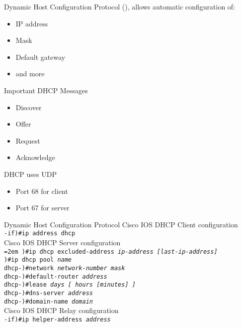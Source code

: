 \begin{frame}{Dynamic Host Configuration Protocol}
	 (), allows automatic configuration of:\pause
	\begin{itemize}[<+->]
		\item IP address
		\item Mask
		\item Default gateway
		\item and more
	\end{itemize}
	Important DHCP Messages\pause
	\begin{itemize}[<+->]
		\item Discover
		\item Offer
		\item Request
		\item Acknowledge
	\end{itemize}
	DHCP uses UDP\pause
	\begin{itemize}[<+->]
		\item Port 68 for client
		\item Port 67 for server
	\end{itemize}
\end{frame}

\begin{frame}{Dynamic Host Configuration Protocol}
	Cisco IOS DHCP Client configuration
	\\\pause\texttt{-if)\#ip address dhcp}
	\\\vspace{0.5cm}\pause Cisco IOS DHCP Server configuration
	\texttt{
		\\\pause \hangindent=2em )\#ip dhcp excluded-address \textit{ip-address [last-ip-address]}
		\\\pause )\#ip dhcp pool \textit{name}
		\\\pause dhcp-)\#network \textit{network-number mask}
		\\\pause dhcp-)\#default-router \textit{address}
		\\\pause dhcp-)\#lease \textit{days [ hours [minutes] ]}
		\\\pause dhcp-)\#dns-server \textit{address}
		\\\pause dhcp-)\#domain-name \textit{domain}
	}\\\vspace{0.5cm}
	\pause Cisco IOS DHCP Relay configuration
	\\\pause\texttt{-if)\#ip helper-address \textit{address}}
\end{frame}

